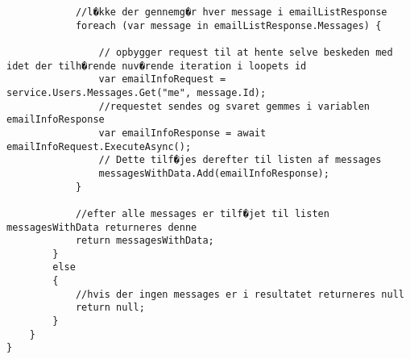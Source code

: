 \begin{verbatim}
            //l�kke der gennemg�r hver message i emailListResponse
            foreach (var message in emailListResponse.Messages) { 

                // opbygger request til at hente selve beskeden med idet der tilh�rende nuv�rende iteration i loopets id
                var emailInfoRequest = service.Users.Messages.Get("me", message.Id);
                //requestet sendes og svaret gemmes i variablen emailInfoResponse
                var emailInfoResponse = await emailInfoRequest.ExecuteAsync();
                // Dette tilf�jes derefter til listen af messages
                messagesWithData.Add(emailInfoResponse);
            }

            //efter alle messages er tilf�jet til listen messagesWithData returneres denne
            return messagesWithData;
        }
        else
        {
            //hvis der ingen messages er i resultatet returneres null
            return null;
        }
    }
}
\end{verbatim}
